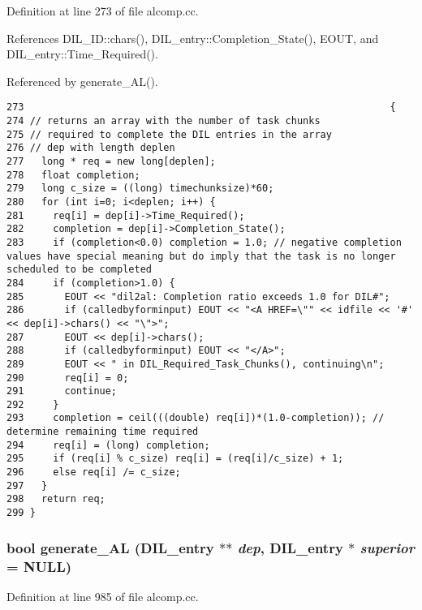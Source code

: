 Definition at line 273 of file alcomp.cc.

References DIL\_\-ID::chars(), DIL\_\-entry::Completion\_\-State(), EOUT, and DIL\_\-entry::Time\_\-Required().

Referenced by generate\_\-AL().



\footnotesize\begin{verbatim}273                                                               {
274 // returns an array with the number of task chunks
275 // required to complete the DIL entries in the array
276 // dep with length deplen
277   long * req = new long[deplen];
278   float completion;
279   long c_size = ((long) timechunksize)*60;
280   for (int i=0; i<deplen; i++) {
281     req[i] = dep[i]->Time_Required();
282     completion = dep[i]->Completion_State();
283     if (completion<0.0) completion = 1.0; // negative completion values have special meaning but do imply that the task is no longer scheduled to be completed
284     if (completion>1.0) {
285       EOUT << "dil2al: Completion ratio exceeds 1.0 for DIL#";
286       if (calledbyforminput) EOUT << "<A HREF=\"" << idfile << '#' << dep[i]->chars() << "\">";
287       EOUT << dep[i]->chars();
288       if (calledbyforminput) EOUT << "</A>";
289       EOUT << " in DIL_Required_Task_Chunks(), continuing\n";
290       req[i] = 0;
291       continue;
292     }
293     completion = ceil(((double) req[i])*(1.0-completion)); // determine remaining time required
294     req[i] = (long) completion;
295     if (req[i] % c_size) req[i] = (req[i]/c_size) + 1;
296     else req[i] /= c_size;
297   }
298   return req;
299 }
\end{verbatim}\normalsize 
{}
\subsubsection{\setlength{\rightskip}{0pt plus 5cm}bool generate\_\-AL ({\bf DIL\_\-entry} $\ast$$\ast$ {\em dep}, {\bf DIL\_\-entry} $\ast$ {\em superior} = NULL)}\label{alcomp_8cc_a13}




Definition at line 985 of file alcomp.cc.

